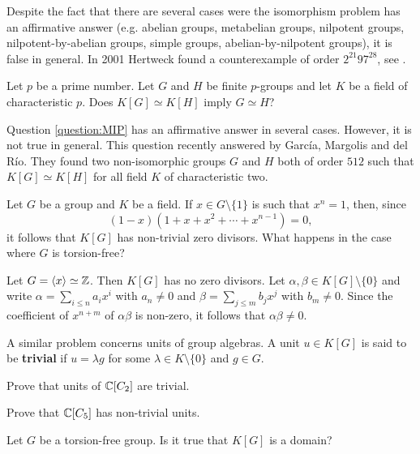 Despite the fact that there are several cases were 
the isomorphism problem has an affirmative answer (e.g. abelian groups, 
metabelian groups, nilpotent groups, nilpotent-by-abelian groups, simple groups, 
abelian-by-nilpotent groups), it is false in general. In 2001  
Hertweck found a counterexample of order $2^{21}97^{28}$, see \cite{MR1847590}.  

\begin{question}
\label{question:MIP}
    Let $p$ be a prime number. Let 
    $G$ and $H$ be finite $p$-groups and let $K$ be a field of characteristic $p$. 
    Does $K[G]\simeq K[H]$ imply $G\simeq H$?
\end{question}   

Question \ref{question:MIP} has an affirmative answer in several cases. However, 
it is not true in general. This question recently answered by Garc\'ia, Margolis and
del R\'io. They found two non-isomorphic groups $G$ and $H$ both of order $512$ 
such that $K[G]\simeq K[H]$ for all field $K$ 
of characteristic two. 


Let $G$ be a group and $K$ be a field. If  
$x\in G\setminus\{1\}$ is such that $x^n=1$, then, since 
\[
(1-x)(1+x+x^2+\cdots+x^{n-1})=0, 
\] 
it follows that $K[G]$ has non-trivial zero divisors. What happens in the case
where $G$ is torsion-free?

\begin{example}
	\label{example:k[Z]}
	Let $G=\langle x\rangle\simeq\mathbb{Z}$. Then $K[G]$ has no zero divisors. 
	Let $\alpha,\beta\in K[G]\setminus\{0\}$ and write 
	$\alpha=\sum_{i\leq n}a_ix^i$ with $a_n\ne 0$ and $\beta=\sum_{j\leq m}b_jx^j$
	with $b_m\ne 0$. Since the coefficient of $x^{n+m}$ of $\alpha\beta$ is non-zero,
	it follows that 
	$\alpha\beta\ne 0$.
\end{example}

A similar problem concerns units of group algebras.  A unit $u\in K[G]$ is said
to be \textbf{trivial} if $u=\lambda g$ for some $\lambda\in K\setminus\{0\}$ and
$g\in G$.	

\begin{exercise}
	Prove that units of $\mathbb{C}[C_2]$ are trivial. 
\end{exercise}

\begin{exercise}
	Prove that $\mathbb{C}[C_5]$ has non-trivial units. 
\end{exercise}

\begin{problem}
	\label{prob:dominio}
	Let $G$ be a torsion-free group. Is it true that 
	$K[G]$ is a domain?
\end{problem}


